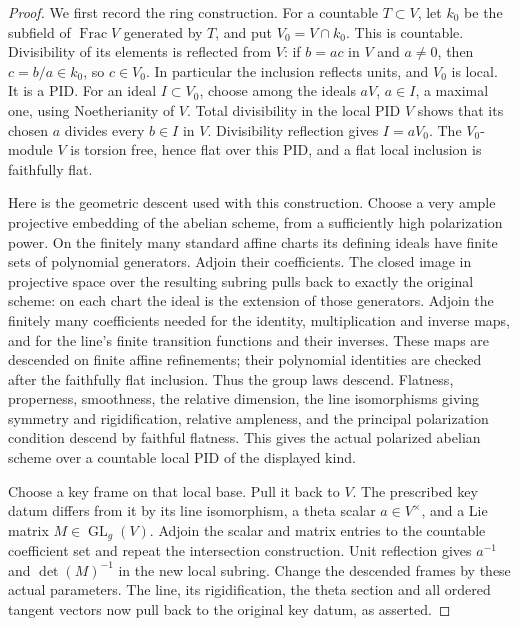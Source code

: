 \begin{proof}
We first record the ring construction.
For a countable \(T\subset V\), let \(k_0\) be the subfield
of \(\operatorname{Frac}V\) generated by \(T\), and put
\(V_0=V\cap k_0\).
This is countable.
Divisibility of its elements is reflected from \(V\):
if \(b=ac\) in \(V\) and \(a\ne0\), then \(c=b/a\in k_0\),
so \(c\in V_0\).
In particular the inclusion reflects units, and \(V_0\)
is local.
It is a PID.  For an ideal \(I\subset V_0\), choose among
the ideals \(aV\), \(a\in I\), a maximal one, using
Noetherianity of \(V\).
Total divisibility in the local PID \(V\) shows that its
chosen \(a\) divides every \(b\in I\) in \(V\).
Divisibility reflection gives \(I=aV_0\).
The \(V_0\)-module \(V\) is torsion free, hence flat over
this PID, and a flat local inclusion is faithfully flat.

Here is the geometric descent used with this construction.
Choose a very ample projective embedding of the abelian
scheme, from a sufficiently high polarization power.
On the finitely many standard affine charts its defining
ideals have finite sets of polynomial generators.
Adjoin their coefficients.
The closed image in projective space over the resulting
subring pulls back to exactly the original scheme:
on each chart the ideal is the extension of those generators.
Adjoin the finitely many coefficients needed for the
identity, multiplication and inverse maps, and for the
line's finite transition functions and their inverses.
These maps are descended on finite affine refinements;
their polynomial identities are checked after the
faithfully flat inclusion.
Thus the group laws descend.
Flatness, properness, smoothness, the relative dimension,
the line isomorphisms giving symmetry and rigidification,
relative ampleness, and the principal polarization
condition descend by faithful flatness.
This gives the actual polarized abelian scheme over a
countable local PID of the displayed kind.

Choose a key frame on that local base.
Pull it back to \(V\).
The prescribed key datum differs from it by its line
isomorphism, a theta scalar \(a\in V^\times\), and a Lie
matrix \(M\in\operatorname{GL}_g(V)\).
Adjoin the scalar and matrix entries to the countable
coefficient set and repeat the intersection construction.
Unit reflection gives \(a^{-1}\) and
\(\det(M)^{-1}\) in the new local subring.
Change the descended frames by these actual parameters.
The line, its rigidification, the theta section and all
ordered tangent vectors now pull back to the original
key datum, as asserted.


\end{proof}
